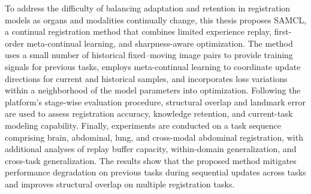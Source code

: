 To address the difficulty of balancing adaptation and retention in registration models as organs and modalities continually change, this thesis proposes SAMCL, a continual registration method that combines limited experience replay, first-order meta-continual learning, and sharpness-aware optimization. The method uses a small number of historical fixed–moving image pairs to provide training signals for previous tasks, employs meta-continual learning to coordinate update directions for current and historical samples, and incorporates loss variations within a neighborhood of the model parameters into optimization. Following the platform’s stage-wise evaluation procedure, structural overlap and landmark error are used to assess registration accuracy, knowledge retention, and current-task modeling capability. Finally, experiments are conducted on a task sequence comprising brain, abdominal, lung, and cross-modal abdominal registration, with additional analyses of replay buffer capacity, within-domain generalization, and cross-task generalization. The results show that the proposed method mitigates performance degradation on previous tasks during sequential updates across tasks and improves structural overlap on multiple registration tasks.
